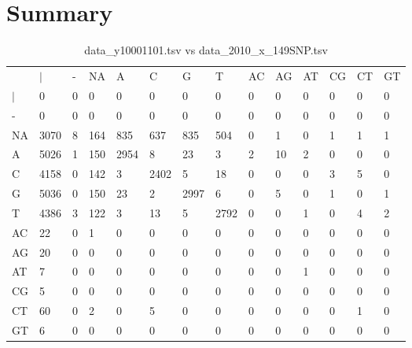 \section{Summary} \label{section_summary}
\begin{center}
\begin{longtable}{|l|l|l|l|l|l|l|l|l|l|l|l|l|l|}
\caption{data\_y10001101.tsv vs data\_2010\_x\_149SNP.tsv} \label{table_dm0}\\
\hline
\\
\hline
&$|$&-&NA&A&C&G&T&AC&AG&AT&CG&CT&GT\\
$|$&0&0&0&0&0&0&0&0&0&0&0&0&0\\
-&0&0&0&0&0&0&0&0&0&0&0&0&0\\
NA&3070&8&164&835&637&835&504&0&1&0&1&1&1\\
A&5026&1&150&2954&8&23&3&2&10&2&0&0&0\\
C&4158&0&142&3&2402&5&18&0&0&0&3&5&0\\
G&5036&0&150&23&2&2997&6&0&5&0&1&0&1\\
T&4386&3&122&3&13&5&2792&0&0&1&0&4&2\\
AC&22&0&1&0&0&0&0&0&0&0&0&0&0\\
AG&20&0&0&0&0&0&0&0&0&0&0&0&0\\
AT&7&0&0&0&0&0&0&0&0&1&0&0&0\\
CG&5&0&0&0&0&0&0&0&0&0&0&0&0\\
CT&60&0&2&0&5&0&0&0&0&0&0&1&0\\
GT&6&0&0&0&0&0&0&0&0&0&0&0&0\\
\hline
\end{longtable}
\end{center}


